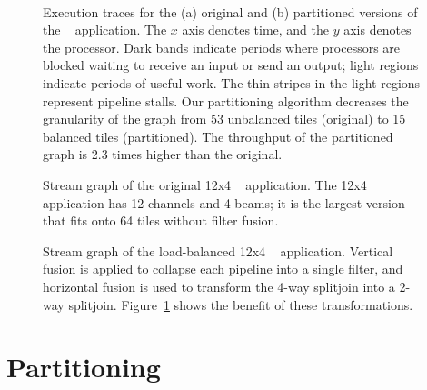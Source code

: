 \begin{figure}
   \\
  \hspace{0.3in}  \vspace{-6pt} \caption{\protect\small Execution
    traces for the (a) original and (b) partitioned versions of the
    \Radar~ application.  The $x$ axis denotes time, and the $y$ axis
    denotes the processor.  Dark bands indicate periods where
    processors are blocked waiting to receive an input or send an
    output; light regions indicate periods of useful work.  The thin
    stripes in the light regions represent pipeline stalls.  Our
    partitioning algorithm decreases the granularity of the graph from
    53 unbalanced tiles (original) to 15 balanced tiles (partitioned).
    The throughput of the partitioned graph is 2.3 times higher than
    the original. \protect\label{fig:beam-blood}}
\vspace{-12pt}
\end{figure}

\begin{figure}
\centering
{}
\caption{\protect\small Stream graph of the original 12x4 \Radar~
application.  The 12x4 \Radar application has 12 channels and 4 beams;
it is the largest version that fits onto 64 tiles without filter
fusion.  \protect\label{fig:beam-orig}}
\vspace{36pt}
\caption{\protect\small Stream graph of the load-balanced 12x4
\Radar~ application.  Vertical fusion is applied to collapse each pipeline
into a single filter, and horizontal fusion is used to transform the
4-way splitjoin into a 2-way splitjoin.  Figure~\ref{fig:beam-blood}
shows the benefit of these
transformations. \protect\label{fig:beam-opt}}
\end{figure}

\section{Partitioning}
\label{sec:partition}


